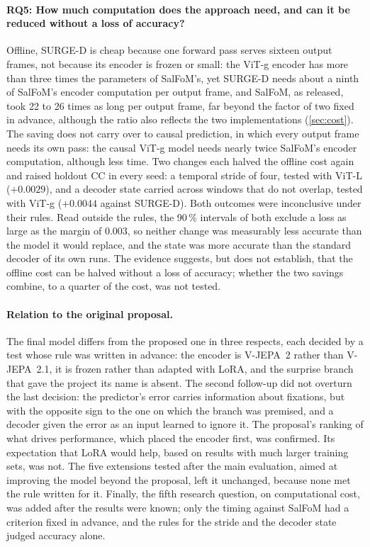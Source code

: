 \paragraph{RQ5: How much computation does the approach need, and can it be
reduced without a loss of accuracy?} Offline, SURGE-D is cheap because one
forward pass serves sixteen output frames, not because its encoder is frozen or
small: the \acrshort{ViT}-g encoder has more than three times the parameters of
SalFoM's, yet SURGE-D needs about a ninth of SalFoM's encoder computation per
output frame, and SalFoM, as released, took 22 to 26 times as long per output
frame, far beyond the factor of two fixed in advance, although the ratio also
reflects the two implementations (\cref{sec:cost}). The saving does not carry
over to causal prediction, in which every output frame needs its own pass: the
causal \acrshort{ViT}-g model needs nearly twice SalFoM's encoder computation,
although less time. Two changes each halved the offline cost again and raised
holdout \acrshort{CC} in every seed: a temporal stride of four, tested with
\acrshort{ViT}-L ($+0.0029$), and a decoder state carried across windows that
do not overlap, tested with \acrshort{ViT}-g ($+0.0044$ against SURGE-D). Both
outcomes were inconclusive under their rules. Read outside the rules, the
90\,\% intervals of both exclude a loss as large as the margin of 0.003, so
neither change was measurably less accurate than the model it would replace,
and the state was more accurate than the standard decoder of its own runs. The
evidence suggests, but does not establish, that the offline cost can be halved
without a loss of accuracy; whether the two savings combine, to a quarter of
the cost, was not tested.

\paragraph{Relation to the original proposal.} The final model differs from the
proposed one in three respects, each decided by a test whose rule was written
in advance: the
encoder is \acrshort{V-JEPA}~2 rather than \acrshort{V-JEPA}~2.1, it is frozen rather than adapted with
\acrshort{LoRA}, and the surprise branch that gave the project its name is absent.
The second follow-up did not overturn the last decision: the predictor's error
carries information about fixations, but with the opposite sign to the one on
which the branch was premised, and a decoder given the error as an input
learned to ignore it. The
proposal's ranking of what drives performance, which placed the encoder first,
was confirmed. Its expectation that \acrshort{LoRA} would help, based on results with much
larger training sets, was not. The five extensions tested after the
main evaluation, aimed at improving the model beyond the proposal, left it
unchanged, because none met the rule written for it. Finally, the fifth
research question, on computational cost, was added after the results were
known; only the timing against SalFoM had a criterion fixed in advance, and
the rules for the stride and the decoder state judged accuracy alone.

